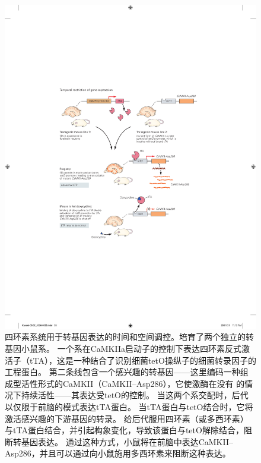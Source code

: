 \begin{figure}[htbp]
	\centering
	\includegraphics[width=0.75\linewidth]{chap02/fig_2_9}
	\caption{四环素系统用于转基因表达的时间和空间调控。培育了两个独立的转基因小鼠系。
		一个系在CaMKIIa启动子的控制下表达四环素反式激活子（tTA），这是一种结合了识别细菌tetO操纵子的细菌转录因子的工程蛋白。
		第二条线包含一个感兴趣的转基因——这里编码一种组成型活性形式的CaMKII（CaMKII–Asp286），它使激酶在没有 的情况下持续活性——其表达受tetO的控制。
		当这两个系交配时，后代以仅限于前脑的模式表达tTA蛋白。
		当tTA蛋白与tetO结合时，它将激活感兴趣的下游基因的转录。
		给后代服用四环素（或多西环素）与tTA蛋白结合，并引起构象变化，导致该蛋白与tetO解除结合，阻断转基因表达。
		通过这种方式，小鼠将在前脑中表达CaMKII–Asp286，并且可以通过向小鼠施用多西环素来阻断这种表达\cite{mayford1996control}。}
	\label{fig:2_9}
\end{figure}


